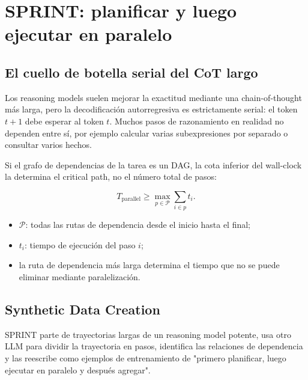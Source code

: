 \section{SPRINT: planificar y luego ejecutar en paralelo}

\subsection{El cuello de botella serial del CoT largo}

Los reasoning models suelen mejorar la exactitud mediante una chain-of-thought más larga, pero la decodificación autorregresiva es estrictamente serial: el token $t+1$ debe esperar al token $t$. Muchos pasos de razonamiento en realidad no dependen entre sí, por ejemplo calcular varias subexpresiones por separado o consultar varios hechos.


Si el grafo de dependencias de la tarea es un DAG, la cota inferior del wall-clock la determina el critical path, no el número total de pasos:

$$
T_{\mathrm{parallel}}\ge \max_{p\in\mathcal P}\sum_{i\in p} t_i.
$$

\begin{itemize}
    \item $\mathcal P$: todas las rutas de dependencia desde el inicio hasta el final;
    \item $t_i$: tiempo de ejecución del paso $i$;
    \item la ruta de dependencia más larga determina el tiempo que no se puede eliminar mediante paralelización.
\end{itemize}

\subsection{Synthetic Data Creation}

SPRINT parte de trayectorias largas de un reasoning model potente, usa otro LLM para dividir la trayectoria en pasos, identifica las relaciones de dependencia y las reescribe como ejemplos de entrenamiento de "primero planificar, luego ejecutar en paralelo y después agregar".


